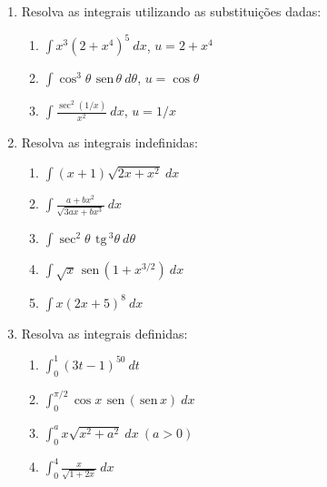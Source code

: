 \documentclass[a4paper,5pt]{amsbook}
\newcommand{\sen}{\,\mbox{sen}\,}
\newcommand{\tg}{\,\mbox{tg}\,}
\newcommand{\ds}{\displaystyle}
\begin{document}
\vspace{1cm}
\begin{enumerate}
	\vspace{0.5cm}
	\item Resolva as integrais utilizando as substitui\c{c}\~oes dadas:
		\begin{enumerate}
			\item $\ds\int x^3{(2+x^4)}^5\ dx$, $u = 2+x^4$
			\item $\ds\int \cos^3\theta\ \sen\theta\ d\theta$, $u=\cos\theta$
			\item $\ds\int \frac{\sec^2(1/x)}{x^2}\ dx$, $u=1/x$
		\end{enumerate}

	\vspace{0.5cm}
	\item Resolva as integrais indefinidas:
		\begin{enumerate}
			\item $\ds\int (x+1)\sqrt{2x+x^2}\ dx$
			\item $\ds\int \frac{a+bx^2}{\sqrt{3ax+bx^3}}\ dx$
			\item $\ds\int \sec^2\theta\ \tg^3\theta\ d\theta$
			\item $\ds\int \sqrt{x}\ \sen{(1+x^{3/2})}\ dx$
			\item $\ds\int x{(2x+5)}^8\ dx$
		\end{enumerate}
	
	\vspace{0.5cm}
	\item Resolva as integrais definidas:
		\begin{enumerate}
			\item $\ds\int_0^1 {(3t-1)}^{50}\ dt$
			\item $\ds\int_0^{\pi/2} \cos{x}\ \sen{(\sen{x})}\ dx$
			\item $\ds\int_0^a x\sqrt{x^2+a^2}\ dx\ (a>0)$
			\item $\ds\int_0^4 \frac{x}{\sqrt{1+2x}}\ dx$
		\end{enumerate}

\end{enumerate}
\end{document}
